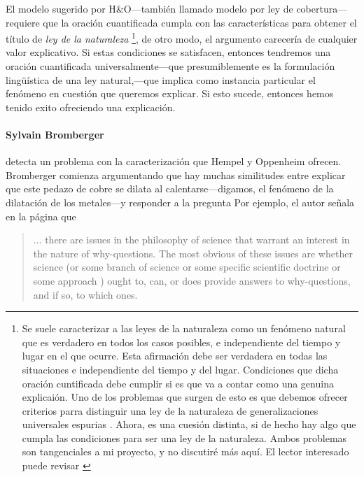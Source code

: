 El modelo sugerido por H$ \& $O---también llamado modelo
por ley de cobertura---requiere que la oración
cuantificada cumpla con las características para
obtener el título de \emph{ley de la naturaleza}
\footnote{
	Se suele caracterizar a las leyes de la naturaleza
	como un fenómeno natural que es verdadero en todos
	los casos posibles, e	independiente del tiempo y
	lugar en el que ocurre. Esta afirmación debe ser
	verdadera en todas las situaciones e independiente
	del tiempo y del lugar. Condiciones que dicha
	oración cuntificada debe	cumplir si es que va a
	contar como una genuina explicaión. Uno de los
	problemas que surgen de esto es que debemos
	ofrecer criterios parra distinguir una ley de la
	naturaleza de generalizaciones	universales
	espurias \parencite{Nagel1962}. Ahora, es una
	cuesión distinta, si de hecho hay algo que cumpla
	las condiciones para ser una ley de la naturaleza.
	Ambos problemas son tangenciales a mi	proyecto,
	y no discutiré más aquí. El lector interesado
	puede	revisar	\parencite{sep-laws-of-nature}
},
de otro modo, el argumento carecería de cualquier
valor explicativo. Si estas condiciones se satisfacen,
entonces tendremos una oración cuantificada
universalmente---que presumiblemente es la
formulación lingüística de una ley natural,---que
implica como instancia particular el fenómeno en
cuestión que queremos explicar. Si esto sucede,
entonces hemos tenido exito ofreciendo una
explicación.

\paragraph{Sylvain Bromberger \citeyear{Bromberger1966}} detecta un problema
con la caracterización que Hempel y Oppenheim ofrecen.
Bromberger comienza argumentando que hay muchas
similitudes entre explicar que este pedazo de cobre se
dilata al calentarse---digamos, el fenómeno de la
dilatación de los metales---y responder a la pregunta
 Por ejemplo, el autor señala en la página
que

    \begin{quote}
    $ \ldots $ there are issues in the philosophy of
	science that warrant an interest in the nature of
	why-questions.	The most obvious of these issues
	are whether science (or some branch of science or
	some specific scientific doctrine or some approach
	) ought to, can, or does provide answers to
	why-questions, and if so,
	to which ones.
	\end{quote}

